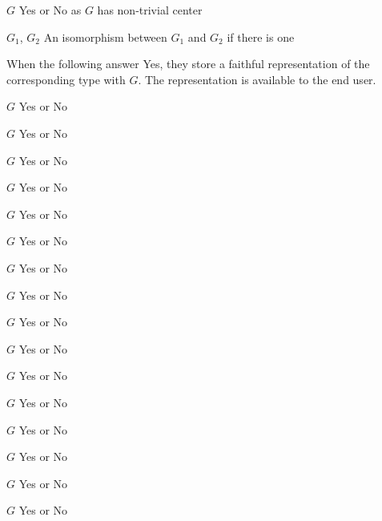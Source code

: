 \begin{enumerate}

{$G$}
{Yes or No as $G$ has non-trivial center}

{$G_1$, $G_2$}
{An isomorphism between $G_1$ and $G_2$ if there is one}

When the following answer Yes, they store a faithful representation of
the corresponding type with $G$. The representation is available to
the end user.

{$G$}
{Yes or No}

{$G$}
{Yes or No}

{$G$}
{Yes or No}

{$G$}
{Yes or No}

{$G$}
{Yes or No}

{$G$}
{Yes or No}

{$G$}
{Yes or No}

{$G$}
{Yes or No}

{$G$}
{Yes or No}

{$G$}
{Yes or No}

{$G$}
{Yes or No}

{$G$}
{Yes or No}

{$G$}
{Yes or No}

{$G$}
{Yes or No}

{$G$}
{Yes or No}

{$G$}
{Yes or No}

\end{enumerate}
